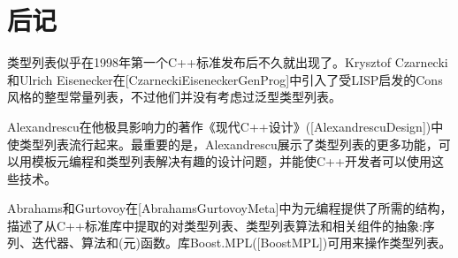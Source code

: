 \section{后记}
类型列表似乎在1998年第一个C++标准发布后不久就出现了。Krysztof Czarnecki和Ulrich Eisenecker在[CzarneckiEiseneckerGenProg]中引入了受LISP启发的Cons风格的整型常量列表，不过他们并没有考虑过泛型类型列表。

Alexandrescu在他极具影响力的著作《现代C++设计》([AlexandrescuDesign])中使类型列表流行起来。最重要的是，Alexandrescu展示了类型列表的更多功能，可以用模板元编程和类型列表解决有趣的设计问题，并能使C++开发者可以使用这些技术。

Abrahams和Gurtovoy在[AbrahamsGurtovoyMeta]中为元编程提供了所需的结构，描述了从C++标准库中提取的对类型列表、类型列表算法和相关组件的抽象:序列、迭代器、算法和(元)函数。库Boost.MPL([BoostMPL])可用来操作类型列表。